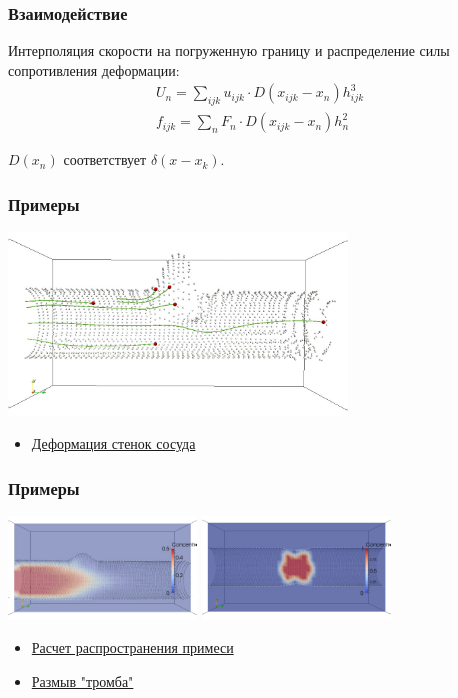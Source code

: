 \documentclass[14pt]{beamer}
\begin{document}
\begin{frame}
\frametitle{Взаимодействие}
Интерполяция скорости на погруженную границу и распределение силы сопротивления деформации:
\begin{gather}
    \label{eq:interpolation}
    U_n = \sum_{ijk}u_{ijk} \cdot D(x_{ijk} - x_n) h_{ijk}^3 \\
    \label{eq:spreading}
    f_{ijk} = \sum_n F_n \cdot D(x_{ijk} - x_n) h^2_n
\end{gather}

$D(x_n)$ соответствует $\delta(x - x_k)$.
\end{frame}

\begin{frame}
\frametitle{Примеры}
    \begin{center}
        \includegraphics[width=9cm]{cylinder2_avi.png}
    \end{center}

\begin{itemize}
    \item[\MVRightarrow] \href{run:video/cylinder2.avi}{Деформация стенок сосуда}
\end{itemize}
\end{frame}

\begin{frame}
\frametitle{Примеры}
    \begin{center}
        \includegraphics[width=5cm]{source_in_vessel_avi.png}
        \vspace{0.40mm}
        \includegraphics[width=5cm]{thrombus_in_vessel_avi.png}
    \end{center}

\begin{itemize}
    \item[\MVRightarrow] \href{run:video/source_in_vessel.avi}{Расчет распространения примеси}
    \item[\MVRightarrow] \href{run:video/thrombus_in_vessel.avi}{Размыв "тромба"}
\end{itemize}
\end{frame}
\end{document}
